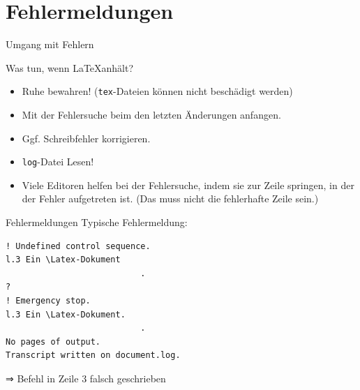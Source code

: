\documentclass[
	vorläufig=true,
	datum=2016-10-28,
	titel={Allgemeine Formatierung und Pakete},
	web=false,
]{../tex/latexkurs-slides}
\begin{document}
\section{Fehlermeldungen}
\begin{frame}[t]{Umgang mit Fehlern}
	\begin{block}{Was tun, wenn \LaTeX anhält?}
		\begin{itemize}
			\item Ruhe bewahren! (\texttt{tex}-Dateien können nicht beschädigt werden)
			\item Mit der Fehlersuche beim den letzten Änderungen anfangen.
			\item Ggf. Schreibfehler korrigieren.
			\item \texttt{log}-Datei Lesen!
			\item Viele Editoren helfen bei der Fehlersuche, indem sie zur Zeile springen, in der der Fehler aufgetreten ist. (Das muss nicht die fehlerhafte Zeile sein.)
		\end{itemize}
	\end{block}
\end{frame}

\begin{frame}[fragile,t]{Fehlermeldungen}
Typische Fehlermeldung:
\begin{lstlisting}
! Undefined control sequence.
l.3 Ein \Latex-Dokument
                           .
? 
! Emergency stop.
l.3 Ein \Latex-Dokument.
                           .
No pages of output.
Transcript written on document.log.
\end{lstlisting}
⇒ Befehl in Zeile 3 falsch geschrieben
\end{frame}

\end{document}
